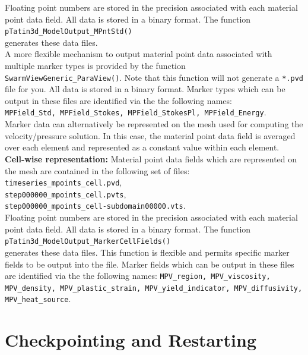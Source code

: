 \documentclass[paper=a4, fontsize=10pt,twoside]{scrartcl}
\newcommand{\unix}[1]{\texttt{\footnotesize #1}}
\begin{document}
Floating point numbers are stored in the precision associated with each material point data field. All data is stored in a binary format. The function \\
\unix{pTatin3d\_ModelOutput\_MPntStd()} \\
generates these data files.
\\[8pt]
A more flexible mechanism to output material point data associated with multiple marker types is provided by the function \unix{SwarmViewGeneric\_ParaView()}. Note that this function will not generate a \texttt{*.pvd} file for you.  All data is stored in a binary format. Marker types which can be output in these files are identified via the the following names: \\
\unix{MPField\_Std, MPField\_Stokes, MPField\_StokesPl, MPField\_Energy}.
\\[8pt]
Marker data can alternatively be represented on the mesh used for computing the velocity/pressure solution.
In this case, the material point data field is averaged over each element and represented as a constant value within each element.
\\[8pt]
{\bf Cell-wise representation:} Material point data fields which are represented on the mesh are contained in the following set of files:\\
\unix{timeseries\_mpoints\_cell.pvd}, \\
\unix{step000000\_mpoints\_cell.pvts}, \\
\unix{step000000\_mpoints\_cell-subdomain00000.vts}. \\
Floating point numbers are stored in the precision associated with each material point data field. All data is stored in a binary format.
The function \\
	\unix{pTatin3d\_ModelOutput\_MarkerCellFields()} \\
generates these data files. This function is flexible and permits specific marker fields to be output into the file. Marker fields which can be output in these files are identified via the the following names:
\unix{MPV\_region, MPV\_viscosity, MPV\_density, MPV\_plastic\_strain, MPV\_yield\_indicator, MPV\_diffusivity, MPV\_heat\_source}.

\section{Checkpointing and Restarting} \label{sec:checkpoint}
\end{document}
